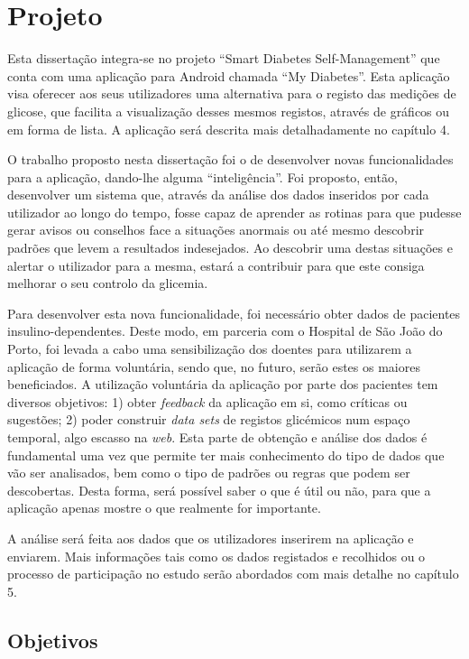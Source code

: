 \section{Projeto}


Esta dissertação integra-se no projeto ``Smart Diabetes Self-Management'' que conta com uma aplicação para Android chamada ``My Diabetes''. Esta aplicação visa oferecer aos seus utilizadores uma alternativa para o registo das medições de glicose, que facilita a visualização desses mesmos registos, através de gráficos ou em forma de lista. A aplicação será descrita mais detalhadamente no capítulo 4. 

O trabalho proposto nesta dissertação foi o de desenvolver novas funcionalidades para a aplicação, dando-lhe alguma ``inteligência''. Foi proposto, então, desenvolver um sistema que, através da análise dos dados inseridos por cada utilizador ao longo do tempo, fosse capaz de aprender as rotinas para que pudesse gerar avisos ou conselhos face a situações anormais ou até mesmo descobrir padrões que levem a resultados indesejados. Ao descobrir uma destas situações e alertar o utilizador para a mesma, estará a contribuir para que este consiga melhorar o seu controlo da glicemia.

Para desenvolver esta nova funcionalidade, foi necessário obter dados de pacientes insulino-dependentes. Deste modo, em parceria com o Hospital de São João do Porto, foi levada a cabo uma sensibilização dos doentes para utilizarem a aplicação de forma voluntária, sendo que, no futuro, serão estes os maiores beneficiados.
A utilização voluntária da aplicação por parte dos pacientes tem diversos objetivos: 1) obter \textit{feedback} da aplicação em si, como críticas ou sugestões; 2) poder construir \textit{data sets} de registos glicémicos num espaço temporal, algo escasso na \textit{web}. Esta parte de obtenção e análise dos dados é fundamental uma vez que permite ter mais conhecimento do tipo de dados que vão ser analisados, bem como o tipo de padrões ou regras que podem ser descobertas. Desta forma, será possível saber o que é útil ou não, para que a aplicação apenas mostre o que realmente for importante. 

A análise será feita aos dados que os utilizadores inserirem na aplicação e enviarem. Mais informações tais como os dados registados e recolhidos ou o processo de participação no estudo serão abordados com mais detalhe no capítulo 5.


\subsection{Objetivos}

